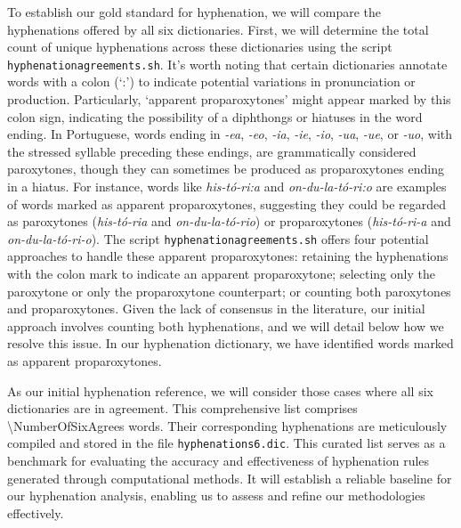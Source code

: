 To establish our gold standard for hyphenation, we will compare the
hyphenations offered by all six dictionaries. First, we will determine the
total count of unique hyphenations across these dictionaries using the script
\texttt{hyphenation\-agreements.sh}. It's worth noting that certain
dictionaries annotate words with a colon (`:') to indicate potential variations
in pronunciation or production. Particularly, `apparent proparoxytones' might
appear marked by this colon sign, indicating the possibility of a diphthongs or
hiatuses in the word ending. In Portuguese, words ending in \emph{-ea},
\emph{-eo}, \emph{-ia}, \emph{-ie}, \emph{-io}, \emph{-ua}, \emph{-ue}, or
\emph{-uo}, with the stressed syllable preceding these endings, are
grammatically considered paroxytones, though they can sometimes be produced as
proparoxytones ending in a hiatus. For instance, words like \emph{his-tó-ri:a}
and \emph{on-du-la-tó-ri:o} are examples of words marked as apparent
proparoxytones, suggesting they could be regarded as paroxytones
(\emph{his-tó-ria} and \emph{on-du-la-tó-rio}) or proparoxytones
(\emph{his-tó-ri-a} and \emph{on-du-la-tó-ri-o}). The script
\texttt{hyphenationagreements.sh} offers four potential approaches to handle
these apparent proparoxytones: retaining the hyphenations with the colon mark
to indicate an apparent proparoxytone; selecting only the paroxytone or only
the proparoxytone counterpart; or counting both paroxytones and proparoxytones.
Given the lack of consensus in the literature, our initial approach involves
counting both hyphenations, and we will detail below how we resolve this issue.
In our hyphenation dictionary, we have identified \NumberOfAppProp{} words
marked as apparent proparoxytones.

As our initial hyphenation reference, we will consider those cases where all
six dictionaries are in agreement. This comprehensive list comprises
\num{\NumberOfSixAgrees} words. Their corresponding hyphenations are
meticulously compiled and stored in the file \texttt{hyphenations6.dic}. This
curated list serves as a benchmark for evaluating the accuracy and
effectiveness of hyphenation rules generated through computational methods. It
will establish a reliable baseline for our hyphenation analysis, enabling us to
assess and refine our methodologies effectively.


